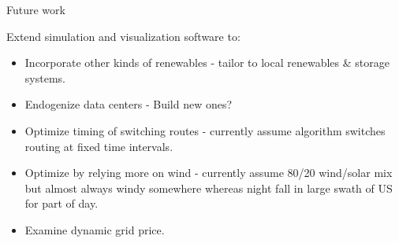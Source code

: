 \documentclass[xcolor=dvipsnames]{beamer}
\begin{document}

\begin{frame}{Future work}

Extend simulation and visualization software to:

\begin{itemize}
\item Incorporate other kinds of renewables - tailor to local renewables \& storage systems.
\item Endogenize data centers - Build new ones? 
\item Optimize timing of switching routes - currently assume algorithm switches routing at fixed time intervals. 
\item Optimize by relying more on wind - currently assume 80/20 wind/solar mix but almost always windy somewhere whereas night fall in large swath of US for part of day. 
\item Examine dynamic grid price.  
\end{itemize}

\end{frame}
\end{document}
